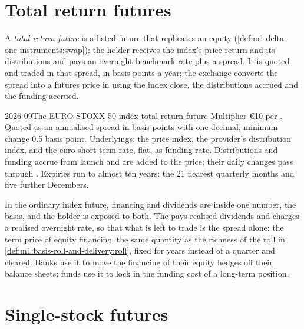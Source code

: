 \section{Total return futures}

\begin{definition}\label{def:m1:index-and-single-stock-futures-worldwide:trf}
A \emph{total return future} is a listed future
that replicates an equity 
(\cref{def:m1:delta-one-instruments:swap}): the holder receives the index's
price return and its distributions and pays an overnight benchmark rate plus
a spread. It is quoted and traded in that spread, in basis points a year;
the exchange converts the spread into a futures price in  using
the index close, the distributions accrued and the funding accrued.
\end{definition}

\begin{dated}{2026-09}{The EURO STOXX 50 index total return future}\label{dat:m1:index-and-single-stock-futures-worldwide:tesx}
Multiplier \euro10 per . Quoted as an annualised spread in basis
points with one decimal, minimum change 0.5 basis point. Underlyings: the
price index, the provider's distribution index, and the euro short-term
rate, flat, as funding rate. Distributions and funding accrue from launch
and are added to the price; their daily changes pass through . Expiries run to almost ten years: the 21 nearest quarterly months
and five further Decembers.
\end{dated}

In the ordinary index future, financing and dividends are inside one number,
the basis, and the holder is exposed to both. The  pays
realised dividends and charges a realised overnight rate, so that what is
left to trade is the spread alone: the term price of equity financing, the
same quantity as the richness of the roll in
\cref{def:m1:basis-roll-and-delivery:roll}, fixed for years instead of a
quarter and cleared. Banks use it to move the financing of their equity
hedges off their balance sheets; funds use it to lock in the funding cost of
a long-term position.

\section{Single-stock futures}

